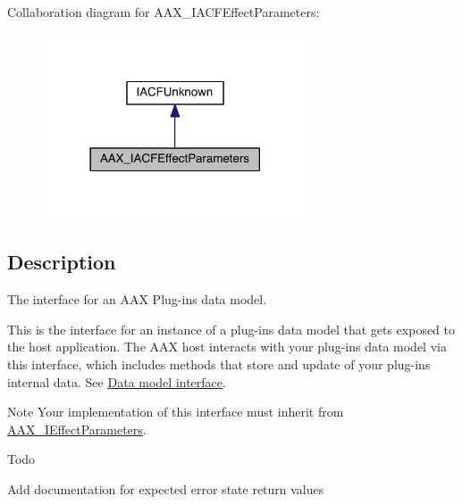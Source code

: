 Collaboration diagram for A\+A\+X\+\_\+\+I\+A\+C\+F\+Effect\+Parameters\+:
\nopagebreak
\begin{figure}[H]
\begin{center}
\leavevmode
\includegraphics[width=222pt]{a00527}
\end{center}
\end{figure}


\subsection{Description}
The interface for an A\+A\+X Plug-\/in\textquotesingle{}s data model. 

This is the interface for an instance of a plug-\/in\textquotesingle{}s data model that gets exposed to the host application. The A\+A\+X host interacts with your plug-\/in\textquotesingle{}s data model via this interface, which includes methods that store and update of your plug-\/in\textquotesingle{}s internal data. See \hyperlink{a00328}{Data model interface}.

\begin{DoxyNote}{Note}
Your implementation of this interface must inherit from \hyperlink{a00099}{A\+A\+X\+\_\+\+I\+Effect\+Parameters}.
\end{DoxyNote}
\begin{DoxyRefDesc}{Todo}
\item[\hyperlink{a00382__todo000031}{Todo}]Add documentation for expected error state return values\end{DoxyRefDesc}
